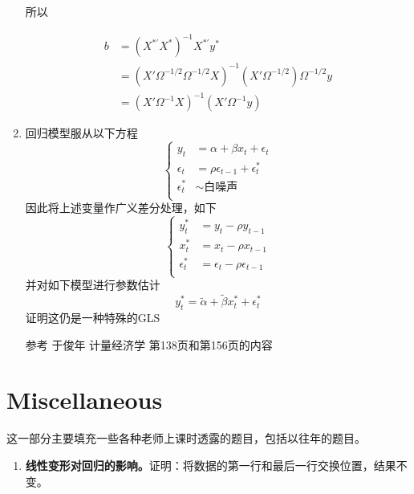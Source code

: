 \documentclass{article}
\begin{document}
\begin{enumerate}
    所以
    
    $$
    \begin{aligned}
      b &= (X^{*'}X^*)^{-1}X^{*'}y^* \\
      &= (X'\Omega^{-1/2}\Omega^{-1/2}X)^{-1}(X'\Omega^{-1/2})\Omega^{-1/2}y \\
      &= (X'\Omega^{-1} X)^{-1}(X'\Omega^{-1}y)
    \end{aligned}
    $$
    
    \item 回归模型服从以下方程
    $$
    \left\{
      \begin{aligned}
        y_t&=\alpha+\beta x_t+\epsilon_t \\
        \epsilon_t&=\rho \epsilon_{t-1}+\epsilon_t^{*} \\
        \epsilon_t^{*} &\sim \text{白噪声}\\
      \end{aligned}
    \right.
    $$
    因此将上述变量作广义差分处理，如下
    $$
    \left\{
      \begin{aligned}
        y_t^* &= y_t-\rho y_{t-1} \\
        x_t^* &= x_t-\rho x_{t-1}  \\
        \epsilon_t^* &= \epsilon_t-\rho \epsilon_{t-1} \\
      \end{aligned}
    \right.
    $$
    并对如下模型进行参数估计
    $$
      y_t^* = \widetilde{\alpha}+\widetilde{\beta}x_t^*+\epsilon_t^*
    $$
    证明这仍是一种特殊的GLS

    参考 于俊年 计量经济学 第138页和第156页的内容
\end{enumerate}

\section*{Miscellaneous}

这一部分主要填充一些各种老师上课时透露的题目，包括以往年的题目。

\begin{enumerate}
    \item \textbf{线性变形对回归的影响。}证明：将数据的第一行和最后一行交换位置，结果不变。
\end{enumerate}
\end{document}

